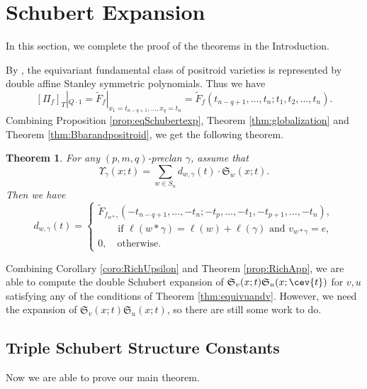\documentclass[12pt,reqno]{amsart}
\numberwithin{equation}{section}
\newtheorem{theorem}{Theorem}[section]
\theoremstyle{definition}
\begin{document}
\section{Schubert Expansion}\label{Schubert Expansion}

In this section, we complete the proof of the theorems in the Introduction. 

By \cite{KLS,LLS18}, the equivariant fundamental class of positroid varieties is represented by double affine Stanley symmetric polynomials. 
Thus we have 
$$[\Pi_f]_T|_{Q\cdot 1} = 
\widetilde{F}_f|_{x_1=t_{n-q+1},\ldots,x_q=t_n}
=\widetilde{F}_{f}(t_{n-q+1},\ldots,t_n;t_1,t_2,\ldots,t_n).$$
Combining Proposition \ref{prop:eqSchubertexp}, 
Theorem \ref{thm:globalization} and Theorem \ref{thm:Bbarandpositroid}, we get the following theorem. 

\begin{theorem}\label{thm:Sorbitexpansion}
For any $(p,m,q)$-preclan $\gamma$, assume that 
$$\Upsilon_\gamma(x;t) = \sum_{w\in S_n}
d_{w,\gamma}(t)\cdot \mathfrak{S}_w(x;t).$$
Then we have
\begin{equation*}\label{eq:affcoeff}
d_{w,\gamma}(t)=
\begin{cases}
\widetilde{F}_{f_{w*\gamma}}(-t_{n-q+1},\ldots,-t_n;-t_p,\ldots,-t_1,-t_{p+1},\ldots,-t_n),\\\qquad  \text{if } \ell(w*\gamma)=\ell(w)+\ell(\gamma) \text{ and } v_{w*\gamma}=e,\\[1ex]
0, \quad \text{otherwise}.
\end{cases}
\end{equation*}
\end{theorem}

Combining Corollary \ref{coro:RichUpsilon} and Theorem \ref{prop:RichApp}, we are able to compute the double Schubert expansion of
$
\mathfrak{S}_v(x;t)
\mathfrak{S}_u(x;\cev{t})$
for $v,u$ satisfying any of the conditions of Theorem \ref{thm:equivuandv}. 
However, we need the expansion of 
$\mathfrak{S}_v(x;t)
\mathfrak{S}_u(x;t)$, so there  are still some work  to do. 

\subsection{Triple Schubert Structure Constants}
Now we are able to prove our main theorem. 
\end{document}
